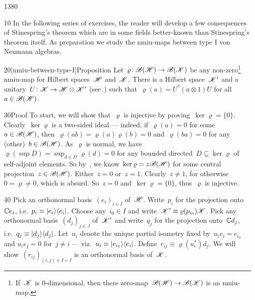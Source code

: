 \begin{parsec}{1380}%
\begin{point}{10}%
In the following series of exercises, the reader will develop
    a few consequences of Stinespring's theorem
    which are in some fields better-known than
    Stinespring's theorem itself.
As preparation we study the nmiu-maps between type I von Neumann algebras.
\end{point}
\begin{point}{20}[nmiu-between-type-I]{Proposition}%
Let~$\varrho\colon \mathscr{B}(\mathscr{H}) \to \mathscr{B}(\mathscr{K})$    
    be any non-zero\footnote{
        If~$\mathscr{K}$ is 0-dimensional,
            then there zero-map~$\mathscr{B}(\mathscr{H}) \to \mathscr{B}(\mathscr{K})$
            is an nmiu-map.} nmiu-map for Hilbert spaces~$\mathscr{H}$ and~$\mathscr{K}$.
There is a Hilbert space~$\mathscr{K}'$
    and a unitary~$U\colon \mathscr{K} \to \mathscr{H} \otimes \mathscr{K}'$
    (see~)
    such that~$\varrho(a) = U^* (a\otimes 1) U $
    for all~$a \in \mathscr{B}(\mathscr{H})$.
\begin{point}{30}{Proof}%
To start, we will show that~$\varrho$ is injective
    by proving~$\ker\varrho = \{0\}$.
Clearly~$\ker \varrho$ is a two-sided ideal
    --- indeed, if~$\varrho(a) = 0$ for some~$a\in \mathscr{B}(\mathscr{H})$,
    then~$\varrho(ab) = \varrho(a)\varrho(b) = 0$
        and~$\varrho(ba) = 0$
        for any (other)~$b \in \mathscr{B}(\mathscr{H})$.
As~$\varrho$ is normal,
    we have~$\varrho(\sup D) = \sup_{d \in D} \varrho(d) = 0$
    for any bounded directed~$D\subseteq \ker \varrho$
    of self-adjoint elements.
So by~,
    we know~$\ker \varrho = z \mathscr{B}(\mathscr{H})$
    for some central projection~$z \in \mathscr{B}(\mathscr{H})$.
Either~$z=0$ or~$z=1$.
Clearly~$z\neq 1$, for otherwise~$0=\varrho\neq 0$, which is absurd.
    So~$z=0$ and~$\ker \varrho = \{0\}$, thus~$\varrho $ is injective.
\begin{point}{40}%
Pick an orthonormal basis~$(e_i)_{i \in I}$ of~$\mathscr{H}$.
Write~$p_i$ for the projection onto~$\mathbb{C} e_i$,
    i.e.~$p_i \equiv \left|e_i\right>\!\left<e_i\right|$.
Choose any~$i_0 \in I$
    and write~$\mathscr{K}' \equiv \varrho(p_{i_0}) \mathscr{K}$.
Pick any orthonormal basis~$(d_j)_{j \in J}$ of~$\mathscr{K}'$
    and write~$q_j$ for the projection onto~$\mathbb{C} d_j$,
    i.e.~$q_j \equiv \left|d_j\right>\!\left<d_j\right|$.
Let~$u_i$ denote the unique partial
        isometry fixed by~$u_i e_i = e_{i_0}$ and
                $u_i e_j = 0$ for~$j\neq i$ ---
                viz.~$u_i \equiv \left|e_{i_0}\right>\!\left<e_i\right|$.
    Define~$r_{ij} \equiv \varrho(u_i^*) d_j$.
We will show~$(r_{ij})_{(i,j) \in I\times J}$ is an orthonormal
    basis of~$\mathscr{K}$.

\end{point}
\end{point}
\end{point}
\end{parsec}
